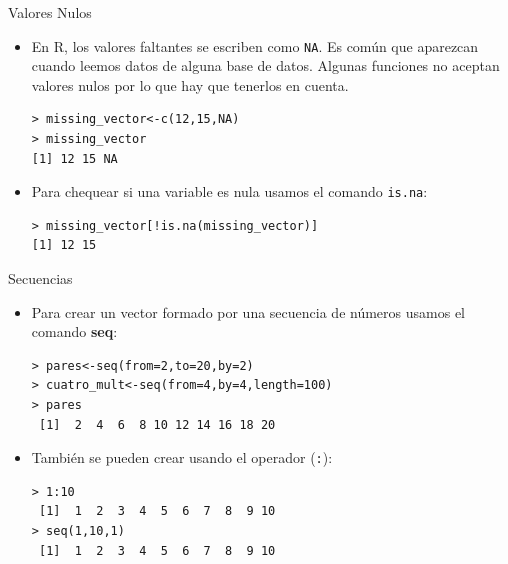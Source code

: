 \documentclass[handout]{beamer}
\begin{document}
\begin{frame}[fragile]{Valores Nulos}
\scriptsize{
\begin{itemize}
\item En R, los valores faltantes se escriben como \verb+NA+. Es común que aparezcan cuando leemos datos de alguna base de datos. Algunas funciones no aceptan valores nulos por lo que hay que tenerlos en cuenta.
\begin{verbatim}
> missing_vector<-c(12,15,NA)
> missing_vector
[1] 12 15 NA
\end{verbatim}

\item Para chequear si una variable es nula usamos el comando \verb+is.na+:
\begin{verbatim}
> missing_vector[!is.na(missing_vector)]
[1] 12 15 
\end{verbatim}



\end{itemize}

 }
 
 
\end{frame}




\begin{frame}[fragile]{Secuencias}
 \scriptsize{
 
 \begin{itemize}
  \item Para crear un vector formado por una secuencia de números usamos el comando \textbf{seq}:
 
 \begin{verbatim}
> pares<-seq(from=2,to=20,by=2)
> cuatro_mult<-seq(from=4,by=4,length=100)
> pares
 [1]  2  4  6  8 10 12 14 16 18 20
 \end{verbatim} 
 \item También se pueden crear usando el operador (\verb+:+):
 \begin{verbatim}
> 1:10
 [1]  1  2  3  4  5  6  7  8  9 10 
> seq(1,10,1)
 [1]  1  2  3  4  5  6  7  8  9 10
 \end{verbatim} 
 \end{itemize}
 
 }
\end{frame}
\end{document}
